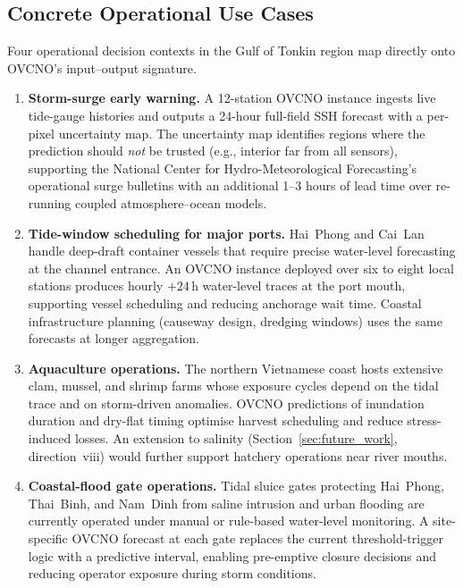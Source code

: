 \documentclass[11pt,a4paper]{article}
\begin{document}
\subsection{Concrete Operational Use Cases}

Four operational decision contexts in the Gulf of Tonkin region map directly onto OVCNO's input--output signature.

\begin{enumerate}
    \item \textbf{Storm-surge early warning.} A 12-station OVCNO instance ingests live tide-gauge histories and outputs a 24-hour full-field SSH forecast with a per-pixel uncertainty map. The uncertainty map identifies regions where the prediction should \emph{not} be trusted (e.g., interior far from all sensors), supporting the National Center for Hydro-Meteorological Forecasting's operational surge bulletins with an additional 1--3 hours of lead time over re-running coupled atmosphere--ocean models.

    \item \textbf{Tide-window scheduling for major ports.} Hai~Phong and Cai~Lan handle deep-draft container vessels that require precise water-level forecasting at the channel entrance. An OVCNO instance deployed over six to eight local stations produces hourly $+24$\,h water-level traces at the port mouth, supporting vessel scheduling and reducing anchorage wait time. Coastal infrastructure planning (causeway design, dredging windows) uses the same forecasts at longer aggregation.

    \item \textbf{Aquaculture operations.} The northern Vietnamese coast hosts extensive clam, mussel, and shrimp farms whose exposure cycles depend on the tidal trace and on storm-driven anomalies. OVCNO predictions of inundation duration and dry-flat timing optimise harvest scheduling and reduce stress-induced losses. An extension to salinity (Section~\ref{sec:future_work}, direction~viii) would further support hatchery operations near river mouths.

    \item \textbf{Coastal-flood gate operations.} Tidal sluice gates protecting Hai~Phong, Thai~Binh, and Nam~Dinh from saline intrusion and urban flooding are currently operated under manual or rule-based water-level monitoring. A site-specific OVCNO forecast at each gate replaces the current threshold-trigger logic with a predictive interval, enabling pre-emptive closure decisions and reducing operator exposure during storm conditions.
\end{enumerate}
\end{document}
